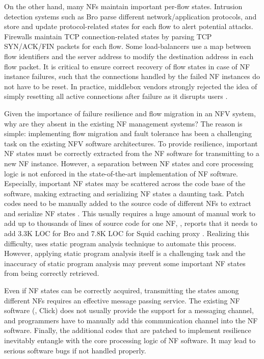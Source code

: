 On the other hand, many NFs maintain important per-flow states. Intrusion
detection systems such as Bro \cite{bro} parse different network/application
protocols, and store and update protocol-related
states for each flow to alert potential attacks. Firewalls \cite{firewall}
maintain TCP connection-related states by parsing TCP SYN/ACK/FIN packets for
each flow. Some load-balancers \cite{lvs} use a map between flow identifiers and
the server address to modify the destination address in each flow packet.
It is critical to ensure correct recovery of flow states in case of NF instance failures, such that the connections handled by the failed NF instances do not have to be reset. In practice, middlebox vendors
strongly rejected the idea of simply resetting all active connections after failure as it
disrupts users \cite{sherry2015rollback}.

Given the importance of failure resilience and flow migration in an NFV system, why are they absent in the existing NF management systems? The reason is simple: implementing flow migration and fault
tolerance has been a challenging task on the existing NFV software architectures. %
 To provide resilience, important NF states must be correctly extracted from the NF software for transmitting to a new NF instance. However, a separation between NF states and core processing logic is not enforced in the state-of-the-art implementation of NF software. Especially, important NF states may be scattered across the code base of the software, making
extracting and serializing NF states a daunting task. Patch codes need to be
manually added to the source code of different NFs to extract and serialize NF
states \cite{gember2015opennf}\cite{rajagopalan2013split}. This usually requires a huge amount of manual work to add up to
thousands of lines of source code for one NF, \eg, \cite{gember2015opennf} reports
that it needs to add 3.3K LOC for Bro \cite{bro} and 7.8K LOC for Squid caching
proxy \cite{squid}.  Realizing this difficulty, \cite{khalid2016paving} uses
static program analysis technique to automate this process. However, applying
static program analysis itself is a challenging task and the inaccuracy of
static program analysis may prevent some important NF states from being
correctly retrieved.

Even if NF states can be correctly acquired, transmitting
the states among different NFs %
 requires an
effective message passing service. The existing NF software (\eg,
Click\cite{kohler2000click}) does not usually provide the support for a messaging channel, and programmers have to manually add this communication
channel into the NF software. Finally, the additional codes that are patched to
implement resilience inevitably entangle with the core processing logic of NF
software. It may lead to serious software bugs if not handled properly.

